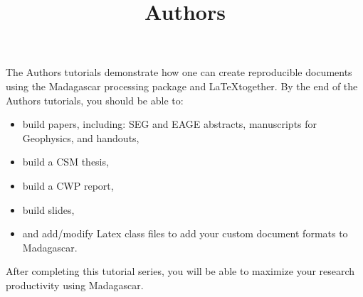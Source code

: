 \title{Authors}
The Authors tutorials demonstrate how one can create reproducible documents using the Madagascar processing package and \LaTeX together.  By the end of the Authors tutorials, you should be able to:
\begin{itemize}
	\item build papers, including: SEG and EAGE abstracts, manuscripts for Geophysics, and handouts,
	\item build a CSM thesis,
    \item build a CWP report,
    \item build slides,
    \item and add/modify Latex class files to add your custom document formats to Madagascar.
\end{itemize}
After completing this tutorial series, you will be able to maximize your research productivity using Madagascar.


%
%
%
%
%
%
%
